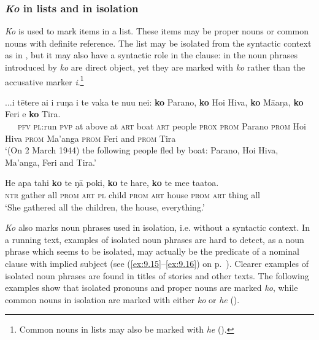 \subsubsection{\textit{Ko} in lists and in isolation}\label{sec:4.7.11.1}

\textit{Ko} is used to mark items in a list. These items may be proper nouns or common nouns with definite reference. The list may be isolated from the syntactic context as in , but it may also have a syntactic role in the clause: in  the noun phrases introduced by \textit{ko} are direct object, yet they are marked with \textit{ko} rather than the accusative marker \textit{i}.\footnote{\label{fn:241}Common nouns in lists may also be marked with \textit{he} ().}

\ea\label{ex:4.320}
\gll ...i tētere ai {\ꞌ}i ruŋa i te vaka te nu{\ꞌ}u nei: \textbf{ko} Parano,  \textbf{ko} Hoi Hiva, \textbf{ko} Mā{\ꞌ}aŋa, \textbf{ko} Feri {\ꞌ}e \textbf{ko} Tira.\\
~~~\textsc{pfv} \textsc{pl}:run \textsc{pvp} at above at \textsc{art} boat \textsc{art} people \textsc{prox} \textsc{prom} Parano  \textsc{prom} Hoi Hiva \textsc{prom} Ma’anga \textsc{prom} Feri and \textsc{prom} Tira\\

\glt 
‘(On 2 March 1944) the following people fled by boat: Parano, Hoi Hiva, Ma’anga, Feri and Tira.’ \textstyleExampleref{[R539-1.592]}
\z

\ea\label{ex:4.321}
\gll He {\ꞌ}apa tahi \textbf{ko} te ŋā poki, \textbf{ko} te hare, \textbf{ko} te me{\ꞌ}e ta{\ꞌ}ato{\ꞌ}a. \\
\textsc{ntr} gather all \textsc{prom} \textsc{art} \textsc{pl} child \textsc{prom} \textsc{art} house \textsc{prom} \textsc{art} thing all \\

\glt
‘She gathered all the children, the house, everything.’ \textstyleExampleref{[R352.103]} 
\z

\textit{Ko} also marks noun phrases used in isolation, i.e. without a syntactic context. In a running text, examples of isolated noun phrases are hard to detect, as a noun phrase which seems to be isolated, may actually be the predicate of a nominal clause with implied subject (see (\ref{ex:9.15}–\ref{ex:9.16}) on p.~\pageref{ex:9.15}). Clearer examples of isolated noun phrases are found in titles of stories and other texts. The following examples show that isolated pronouns and proper nouns are marked \textit{ko}, while common nouns in isolation are marked with either \textit{ko} or \textit{he} ().

